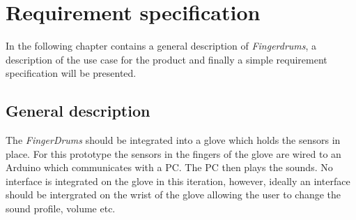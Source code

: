 \chapter{Requirement specification}
\label{kravsspec}
In the following chapter contains a general description of \textit{Fingerdrums}, a description of the use case for the product and finally a simple requirement specification will be presented.


\section{General description}
%

The \textit{FingerDrums} should be integrated into a glove which holds the sensors in place. For this prototype the sensors in the fingers of the glove are wired to an Arduino which communicates with a PC. The PC then plays the sounds. No interface is integrated on the glove in this iteration, however, ideally an interface should be intergrated on the wrist of the glove allowing the user to change the sound profile, volume etc.

